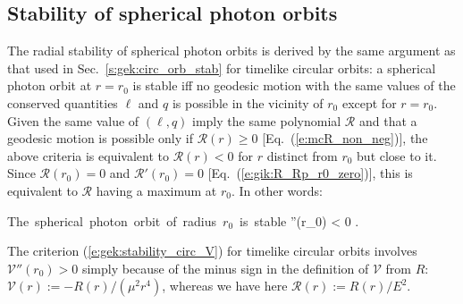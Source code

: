 \subsection{Stability of spherical photon orbits}

The radial stability of spherical photon orbits is derived by the same
argument as that used in Sec.~\ref{s:gek:circ_orb_stab} for timelike circular
orbits: a spherical photon orbit at $r=r_0$ is
stable iff no geodesic motion with the same values of the
conserved quantities $\ell$ and $q$
is possible in the vicinity of $r_0$ except for $r=r_0$. Given
the same value of $(\ell,q)$ imply the same polynomial $\mathcal{R}$ and
that a geodesic
motion is possible only if $\mathcal{R}(r) \geq 0$ [Eq.~(\ref{e:mcR_non_neg})],
the above criteria is equivalent to $\mathcal{R}(r) < 0$
for $r$ distinct from $r_0$ but close to it. Since $\mathcal{R}(r_0) = 0$
and $\mathcal{R}'(r_0) = 0$ [Eq.~(\ref{e:gik:R_Rp_r0_zero})], this is equivalent
to $\mathcal{R}$ having a maximum at $r_0$. In other words:
\begin{greybox}
\be \label{e:gik:stability_spher}
    \mbox{The spherical photon orbit of radius $r_0$ is stable} \iff
    ''(r_0) < 0 .
\ee
\end{greybox}
\begin{remark}
The criterion (\ref{e:gek:stability_circ_V}) for timelike circular orbits involves
$\mathcal{V}''(r_0) > 0$ simply because
of the minus sign in the definition of $\mathcal{V}$ from $R$:
$\mathcal{V}(r) := - R(r) / (\mu^2 r^4)$, whereas we have here
$\mathcal{R}(r) := R(r)/E^2$.
\end{remark}

